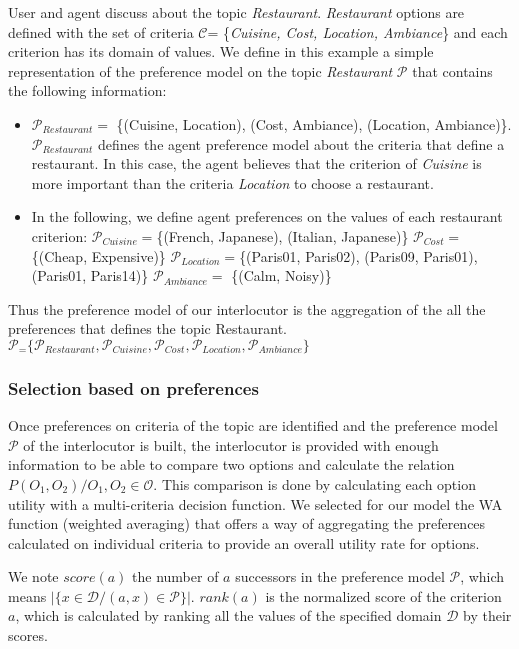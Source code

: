 \documentclass{llncs}
\begin{document}
 
 User and agent discuss about the topic \textit{Restaurant}. \textit{Restaurant} options are defined with the set of criteria $\mathcal{C} $= \{\textit{Cuisine, Cost, Location, Ambiance}\} and each criterion has its domain of values. We define in this example  a simple representation of the  preference model on the topic \textit{Restaurant} $\mathcal{P}$  that contains the following information: 
 \begin{itemize}
 \item $\mathcal{P}_{Restaurant} = $ \{(Cuisine, Location), (Cost, Ambiance), (Location, Ambiance)\}. $\mathcal{P}_{Restaurant}$ defines the agent preference model  about the criteria that define a restaurant. In this case, the agent believes that the criterion of  \textit{Cuisine} is more important than the criteria  \textit{Location} to choose a restaurant.
 \item In the following, we define  agent preferences on the values of each restaurant criterion: 
 \subitem $\mathcal{P}_{Cuisine} = $\{(French, Japanese), (Italian, Japanese)\}
 \subitem $\mathcal{P}_{Cost} = $ \{(Cheap, Expensive)\}
 \subitem $\mathcal{P}_{Location} = $\{(Paris01, Paris02), (Paris09, Paris01), (Paris01, Paris14)\}
  \subitem $\mathcal{P}_{Ambiance} = $ \{(Calm, Noisy)\}
  \end{itemize}
 
 Thus the preference model of our interlocutor is the aggregation of the all the  preferences that defines the topic Restaurant.  \\$\mathcal{P}_= \{\mathcal{P}_{Restaurant}, \mathcal{P}_{Cuisine}, \mathcal{P}_{Cost}, \mathcal{P}_{Location}, \mathcal{P}_{Ambiance}\} $

 \subsubsection{Selection based on preferences}
\par Once preferences on criteria of the topic are identified and the preference model $\mathcal{P}$ of the interlocutor is built, the interlocutor is provided with enough information to be able to compare two options and calculate the relation 
\\$P(O_1, O_2) / O_1, O_2 \in \mathcal{O} $.
 This comparison is done by calculating each option utility with a multi-criteria decision function. We selected for our model the WA \cite{yager2012ordered} function (weighted averaging) that offers a way of aggregating the preferences calculated on individual criteria to provide an overall utility rate for options. 
  \par We note  $score(a)$ the number of $a$  successors in the preference model $\mathcal{P}$, which means $|\{x \in \mathcal{D} / (a,x) \in \mathcal{P}\}|$. 
  $rank(a)$ is the normalized  score of the criterion $a$, which is calculated by ranking all the values of the specified domain $\mathcal{D}$ by their scores. 
  
\end{document}
